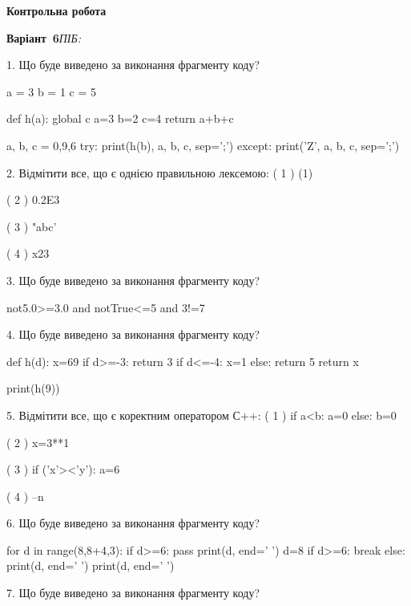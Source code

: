 \documentclass[11pt]{article}
\begin{document}
{\large\textbf{Контрольна робота}}

\textbf{Варіант \No\,6}\hfill \textit{ПІБ:}\,\underline{\hspace{60mm}}
\vspace{4mm}

1. Що буде виведено за виконання фрагменту коду?

a = 3
b = 1
c = 5

def h(a):
global c    a=3
    b=2
    c=4
    return a+b+c

a, b, c = 0,9,6
try:
    print(h(b), a, b, c, sep=';')
except:
    print('Z', a, b, c, sep=';')
\vspace{5mm}

2. %
Відмітити все, що є однією правильною лексемою:
( 1 ) (1)

( 2 ) 0.2E3

( 3 ) "abc'

( 4 ) x23
\vspace{5mm}

3. Що буде виведено за виконання фрагменту коду?

not5.0>=3.0 and notTrue<=5 and 3!=7
\vspace{5mm}

4. Що буде виведено за виконання фрагменту коду?

def h(d):
    x=69
    if d>=-3: 
        return 3
    if d<=-4:
         x=1
    else:
         return 5
    return x

print(h(9))
\vspace{5mm}

5. %
Відмітити все, що є коректним оператором С++:
( 1 ) if a<b: a=0 else: b=0

( 2 ) x=3**1

( 3 ) if ('x'><'y'): a=6

( 4 ) --n
\vspace{5mm}

6. Що буде виведено за виконання фрагменту коду?

for d in range(8,8+4,3):
    if d>=6:
        pass
    print(d, end=' ')
    d=8
    if d>=6:
        break
else:
    print(d, end=' ')
print(d, end=' ')
\vspace{5mm}

7. Що буде виведено за виконання фрагменту коду?
\end{document}
